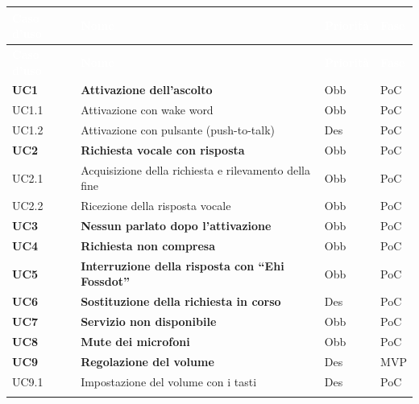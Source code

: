 \documentclass[12pt,a4paper]{article}
\newcommand{\thc}[1]{\textcolor{white}{\textbf{#1}}}
\newcommand{\rl}{\\ \arrayrulecolor{bfline}\hline}
\begin{document}
\begin{longtable}{>{\raggedright\arraybackslash}p{}>{\raggedright\arraybackslash}p{}>{\centering\arraybackslash}p{}>{\centering\arraybackslash}p{}}

\rowcolor{bfblue}\thc{Caso d'uso} & \thc{Nome} & \thc{Priorità} & \thc{Fase} \\

\endfirsthead

\rowcolor{bfblue}\thc{Caso d'uso} & \thc{Nome} & \thc{Priorità} & \thc{Fase} \\

\endhead

\textbf{UC1} & \textbf{Attivazione dell'ascolto} & Obb & PoC \rl

\hspace{1em}UC1.1 & Attivazione con wake word & Obb & PoC \rl

\hspace{1em}UC1.2 & Attivazione con pulsante (push-to-talk) & Des & PoC \rl

\textbf{UC2} & \textbf{Richiesta vocale con risposta} & Obb & PoC \rl

\hspace{1em}UC2.1 & Acquisizione della richiesta e rilevamento della fine & Obb & PoC \rl

\hspace{1em}UC2.2 & Ricezione della risposta vocale & Obb & PoC \rl

\textbf{UC3} & \textbf{Nessun parlato dopo l'attivazione} & Obb & PoC \rl

\textbf{UC4} & \textbf{Richiesta non compresa} & Obb & PoC \rl

\textbf{UC5} & \textbf{Interruzione della risposta con ``Ehi Fossdot''} & Obb & PoC \rl

\textbf{UC6} & \textbf{Sostituzione della richiesta in corso} & Des & PoC \rl

\textbf{UC7} & \textbf{Servizio non disponibile} & Obb & PoC \rl

\textbf{UC8} & \textbf{Mute dei microfoni} & Obb & PoC \rl

\textbf{UC9} & \textbf{Regolazione del volume} & Des & MVP \rl

\hspace{1em}UC9.1 & Impostazione del volume con i tasti & Des & PoC \rl


\end{longtable}
\end{document}
